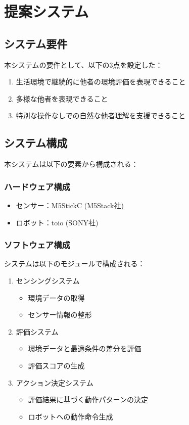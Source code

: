 \documentclass{cuxarticle}
\begin{document}
\chapter{提案システム}

\section{システム要件}
本システムの要件として、以下の3点を設定した：

\begin{enumerate}
  \item 生活環境で継続的に他者の環境評価を表現できること
  \item 多様な他者を表現できること
  \item 特別な操作なしでの自然な他者理解を支援できること
\end{enumerate}

\section{システム構成}
本システムは以下の要素から構成される：

\subsection{ハードウェア構成}
\begin{itemize}
  \item センサー：M5StickC\cite{--M5StickC} (M5Stack社)
  \item ロボット：toio\cite{--小さなキ} (SONY社)
\end{itemize}

\subsection{ソフトウェア構成}
システムは以下のモジュールで構成される：

\begin{enumerate}
  \item センシングシステム
    \begin{itemize}
      \item 環境データの取得
      \item センサー情報の整形
    \end{itemize}

  \item 評価システム
    \begin{itemize}
      \item 環境データと最適条件の差分を評価
      \item 評価スコアの生成
    \end{itemize}

  \item アクション決定システム
    \begin{itemize}
      \item 評価結果に基づく動作パターンの決定
      \item ロボットへの動作命令生成
    \end{itemize}
\end{enumerate}
\end{document}

